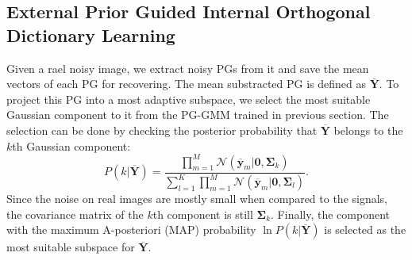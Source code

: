 \documentclass[10pt,twocolumn,letterpaper]{article}
\begin{document}
\subsection{External Prior Guided Internal Orthogonal Dictionary Learning}
Given a rael noisy image, we extract noisy PGs from it and save the mean vectors of each PG for recovering. The mean substracted PG is defined as $\mathbf{\overline{Y}}$. To project this PG into a most adaptive subspace, we select the most suitable Gaussian component to it from the PG-GMM trained in previous section. The selection can be done by checking the posterior probability that $\mathbf{\overline{Y}}$ belongs to the $k$th Gaussian component:
\begin{equation}\label{equ3}
P(k|\mathbf{\overline{Y}})=\frac{\prod_{m=1}^{M}\mathcal{N}(\mathbf{\overline{y}}_{m}|\mathbf{0},\mathbf{\Sigma}_{k})}{\sum_{l=1}^{K}\prod_{m=1}^{M}\mathcal{N}(\mathbf{\overline{y}}_{m}|\mathbf{0},\mathbf{\Sigma}_{l})}.
\end{equation}
Since the noise on real images are mostly small when compared to the signals, the covariance matrix of the $k$th component is still $\mathbf{\Sigma}_{k}$. Finally, the component with the maximum A-posteriori (MAP) probability $\ln P(k|\mathbf{\overline{Y}})$ is selected as the most suitable subspace for $\mathbf{\overline{Y}}$.
\end{document}
